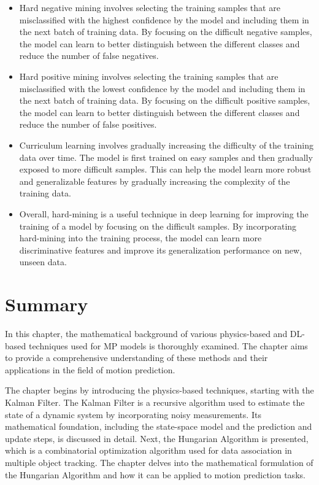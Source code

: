 \begin{itemize}
	\item Hard negative mining involves selecting the training samples that are misclassified with the highest confidence by the model and including them in the next batch of training data. By focusing on the difficult negative samples, the model can learn to better distinguish between the different classes and reduce the number of false negatives.
	
	\item Hard positive mining involves selecting the training samples that are misclassified with the lowest confidence by the model and including them in the next batch of training data. By focusing on the difficult positive samples, the model can learn to better distinguish between the different classes and reduce the number of false positives.
	
	\item Curriculum learning involves gradually increasing the difficulty of the training data over time. The model is first trained on easy samples and then gradually exposed to more difficult samples. This can help the model learn more robust and generalizable features by gradually increasing the complexity of the training data.
	
	\item Overall, hard-mining is a useful technique in deep learning for improving the training of a model by focusing on the difficult samples. By incorporating hard-mining into the training process, the model can learn more discriminative features and improve its generalization performance on new, unseen data.
\end{itemize}

\section{Summary}
\label{sec:3_summary}

In this chapter, the mathematical background of various physics-based and \ac{DL}-based techniques used for \ac{MP} models is thoroughly examined. The chapter aims to provide a comprehensive understanding of these methods and their applications in the field of motion prediction.

The chapter begins by introducing the physics-based techniques, starting with the Kalman Filter. The Kalman Filter is a recursive algorithm used to estimate the state of a dynamic system by incorporating noisy measurements. Its mathematical foundation, including the state-space model and the prediction and update steps, is discussed in detail. Next, the Hungarian Algorithm is presented, which is a combinatorial optimization algorithm used for data association in multiple object tracking. The chapter delves into the mathematical formulation of the Hungarian Algorithm and how it can be applied to motion prediction tasks.

